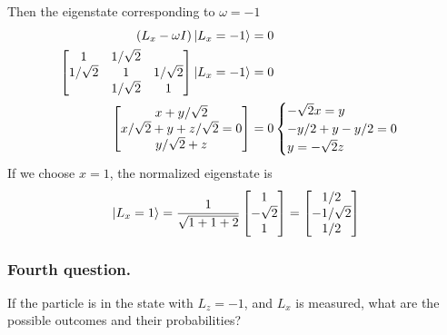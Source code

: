 \documentclass[../../../main.tex]{subfiles}
\begin{document}
Then the eigenstate corresponding to $\omega=-1$
\begin{align*}
    \left( L_x -\omega I  \right) \ket{L_x=-1} & = 0 \\
    \begin{bmatrix}
        1          & 1/\sqrt{2 } &            \\
        1/\sqrt{2} & 1           & 1/\sqrt{2} \\
                   & 1/\sqrt{2}  & 1          \\
    \end{bmatrix}
    \ket{L_x=-1}                               & = 0 \\
    \begin{bmatrix}
        x+y/\sqrt{2}               \\
        x/\sqrt{2 }+y+z/\sqrt{2}=0 \\
        y/\sqrt{2 }+z              \\
    \end{bmatrix}
                                               & = 0
    \begin{cases}
        - \sqrt{2}x=y \\
        -y/2+y-y/2=0  \\
        y=-\sqrt{2}z  \\
    \end{cases}
\end{align*}
If we choose $x=1$, the normalized eigenstate is
\begin{equation*}
    \ket{L_x=1}=
    \frac{1}{\sqrt{1+1+2}}
    \begin{bmatrix}
        1         \\
        -\sqrt{2} \\
        1         \\
    \end{bmatrix}
    =
    \begin{bmatrix}
        1/2         \\
        -1/\sqrt{2} \\
        1/2         \\
    \end{bmatrix}
\end{equation*}

\subsubsection{Fourth question.}
If the particle is in the state with $L_z = -1$, and $L_x$ is measured, what are the possible outcomes and their probabilities?
\end{document}
